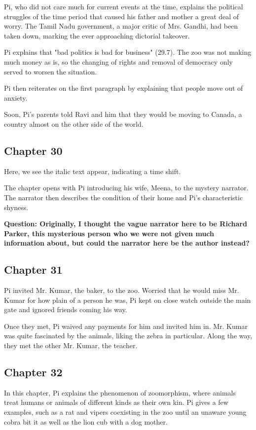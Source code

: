 \documentclass[11pt]{article}
\begin{document}
Pi, who did not care much for current events at the time, explains the political struggles of the time period that caused his father and mother a great deal of worry. The Tamil Nadu government, a major critic of Mrs. Gandhi, had been taken down, marking the ever approaching dictorial takeover.

Pi explains that "bad politics is bad for business" (29.7). The zoo was not making much money as is, so the changing of rights and removal of democracy only served to worsen the situation.

Pi then reiterates on the first paragraph by explaining that people move out of anxiety.

Soon, Pi's parents told Ravi and him that they would be moving to Canada, a country almost on the other side of the world.
\subsection{Chapter 30}
\label{sec:org3878144}
Here, we see the italic text appear, indicating a time shift.

The chapter opens with Pi introducing his wife, Meena, to the mystery narrator. The narrator then describes the condition of their home and Pi's characteristic shyness.

\textbf{Question: Originally, I thought the vague narrator here to be Richard Parker, this mysterious person who we were not given much information about, but could the narrator here be the author instead?}
\subsection{Chapter 31}
\label{sec:orgf013729}
Pi invited Mr. Kumar, the baker, to the zoo. Worried that he would miss Mr. Kumar for how plain of a person he was, Pi kept on close watch outside the main gate and ignored friends coming his way.

Once they met, Pi waived any payments for him and invited him in. Mr. Kumar was quite fascinated by the animals, liking the zebra in particular. Along the way, they met the other Mr. Kumar, the teacher.
\subsection{Chapter 32}
\label{sec:orga8adf03}
In this chapter, Pi explains the phenomenon of zoomorphism, where animals treat humans or animals of different kinds as their own kin. Pi gives a few examples, such as a rat and vipers coexisting in the zoo until an unaware young cobra bit it as well as the lion cub with a dog mother.
\end{document}
